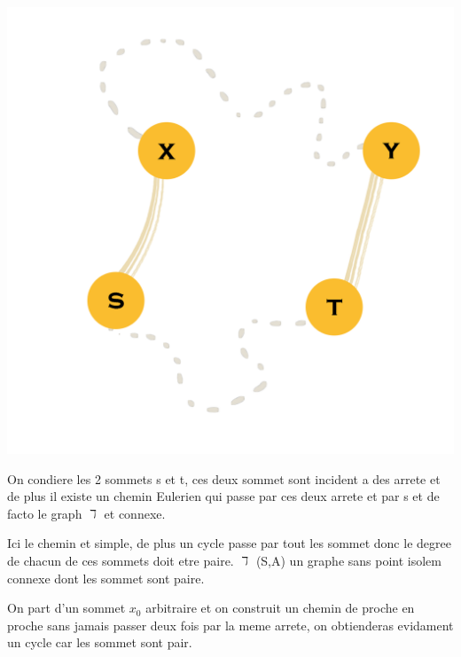 \documentclass[a4paper,11pt]{article}
\begin{document}
         \noindent\begin{minipage}{0.3\textwidth}%
  \includegraphics[width=\linewidth]{graphM3.png}
  \end{minipage}%
  \hfill%
  \begin{minipage}{0.6\textwidth}
      On condiere les 2 sommets s et t, ces deux sommet sont incident a des arrete et de plus il existe un chemin Eulerien qui passe par ces deux arrete et par s et de facto le graph $\daleth$ et connexe.
  \end{minipage}
    Ici le chemin et simple, de plus un cycle passe par tout les sommet donc le degree de chacun de ces sommets doit etre paire.
$\daleth$ (S,A) un graphe sans point isolem connexe dont les sommet sont paire.\\
  \noindent\begin{minipage}{0.6\textwidth}%
    On part d'un sommet $x_0$ arbitraire et on construit un chemin  de proche en proche sans jamais passer deux fois par la meme arrete, on obtienderas evidament un cycle car les sommet sont pair.
  \end{minipage}%
  \hfill%
\end{document}
